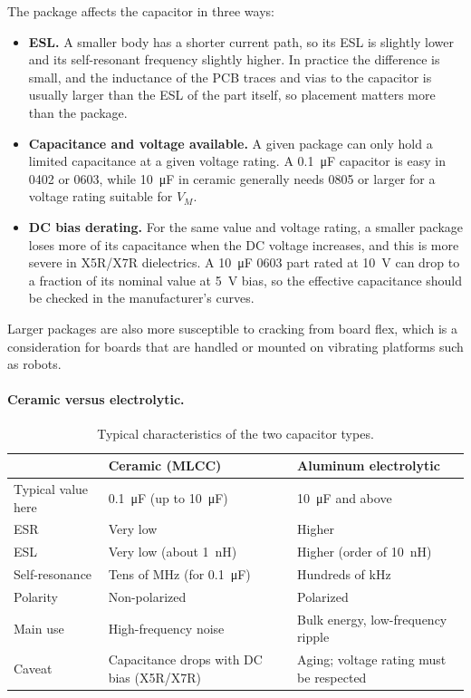 \documentclass[pdflatex,sn-mathphys-num]{sn-jnl}%
\begin{document}
The package affects the capacitor in three ways:
\begin{itemize}
  \item \textbf{ESL.} A smaller body has a shorter current path, so its ESL is
        slightly lower and its self-resonant frequency slightly higher. In
        practice the difference is small, and the inductance of the PCB
        traces and vias to the capacitor is usually larger than the ESL of
        the part itself, so placement matters more than the package.
  \item \textbf{Capacitance and voltage available.} A given package can only
        hold a limited capacitance at a given voltage rating. A
        \SI{0.1}{\micro\farad} capacitor is easy in 0402 or 0603, while
        \SI{10}{\micro\farad} in ceramic generally needs 0805 or larger for a
        voltage rating suitable for $V_M$.
  \item \textbf{DC bias derating.} For the same value and voltage rating, a
        smaller package loses more of its capacitance when the DC voltage
        increases, and this is more severe in X5R/X7R dielectrics. A
        \SI{10}{\micro\farad} 0603 part rated at \SI{10}{\volt} can drop to a
        fraction of its nominal value at \SI{5}{\volt} bias, so the effective
        capacitance should be checked in the manufacturer's curves.
\end{itemize}
Larger packages are also more susceptible to cracking from board flex, which
is a consideration for boards that are handled or mounted on vibrating
platforms such as robots.


\paragraph{Ceramic versus electrolytic.}
\begin{table}[h]
  \centering
  \caption{Typical characteristics of the two capacitor types.}
  \begin{tabular}{lll}
    \toprule
    & Ceramic (MLCC) & Aluminum electrolytic \\
    \midrule
    Typical value here & \SI{0.1}{\micro\farad} (up to \SI{10}{\micro\farad}) & \SI{10}{\micro\farad} and above \\
    ESR & Very low & Higher \\
    ESL & Very low (about \SI{1}{\nano\henry}) & Higher (order of \SI{10}{\nano\henry}) \\
    Self-resonance & Tens of MHz (for \SI{0.1}{\micro\farad}) & Hundreds of kHz \\
    Polarity & Non-polarized & Polarized \\
    Main use & High-frequency noise & Bulk energy, low-frequency ripple \\
    Caveat & Capacitance drops with DC bias (X5R/X7R) & Aging; voltage rating must be respected \\
    \bottomrule
  \end{tabular}
\end{table}
 
\end{document}
